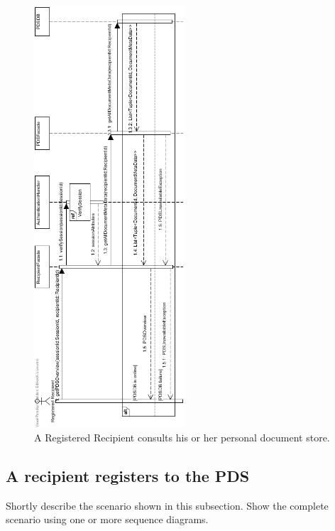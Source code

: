 \documentclass[a4paper,10pt]{article}
\begin{document}
\begin{figure}[!htp]
    \centering
    \includegraphics[width=0.5\textwidth]{ConsultPDS.png}
    \caption{A Registered Recipient consults his or her personal document store.
        }\label{fig:seq_ConsultPDS}
\end{figure}

\subsection{A recipient registers to the PDS}
\label{scenario:RegRecipRegisters}
Shortly describe the scenario shown in this subsection.
Show the complete scenario using one or more sequence diagrams.
\end{document}
